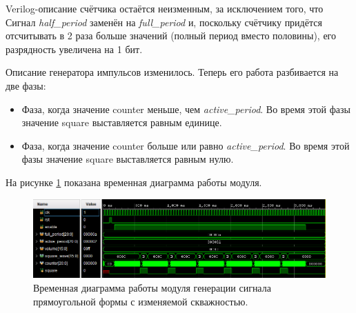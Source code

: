 \noindent
\begin{minipage}{\linewidth}
	
\end{minipage}


Verilog-описание счётчика остаётся неизменным, за исключением того, что Сигнал \textit{half\_period} заменён на \textit{full\_period} и, поскольку счётчику придётся отсчитывать в 2 раза больше значений (полный период вместо половины), его разрядность увеличена на 1 бит.

\noindent
\begin{minipage}{\linewidth}
	
\end{minipage}


Описание генератора импульсов изменилось. Теперь его работа разбивается на две фазы:
\begin{itemize}
	\item Фаза, когда значение counter меньше, чем \textit{active\_period}. Во время этой фазы значение square выставляется равным единице.
	\item Фаза, когда значение counter больше или равно \textit{active\_period}. Во время этой фазы значение square выставляется равным нулю.
\end{itemize}

\noindent
\begin{minipage}{\linewidth}
	
\end{minipage}

На рисунке \ref{lab7:pic6} показана временная диаграмма работы модуля.

\begin{figure}[H]
	\centering
	\includegraphics [width=1\textwidth] {images/lab_7/square_simulate2.PNG}
	\caption{Временная диаграмма работы модуля генерации сигнала прямоугольной формы с изменяемой скважностью.}
	\label{lab7:pic6}
\end{figure}

